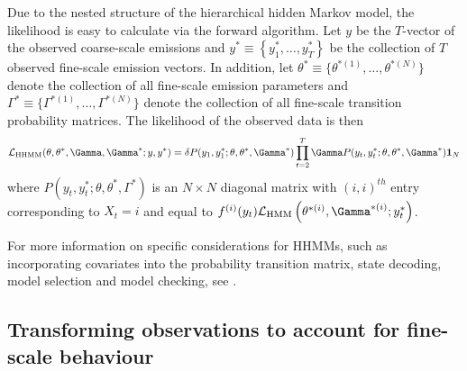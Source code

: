 Due to the nested structure of the hierarchical hidden Markov model, the likelihood is easy to calculate via the forward algorithm.
%
Let $y$ be the $T$-vector of the observed coarse-scale emissions and
$y^* \equiv \left\{y^*_1, \ldots,y^*_T\right\}$ be the collection of $T$ observed fine-scale emission vectors.
%
In addition, let $\theta^* \equiv \{\theta^{*(1)}, \ldots, \theta^{*(N)}\}$ denote the collection of all fine-scale emission parameters and $\Gamma^* \equiv \{\Gamma^{*(1)}, \ldots, \Gamma^{*(N)}\}$ denote the collection of all fine-scale transition probability matrices. The likelihood of the observed data is then
%
\[
\calL_{\text{HHMM}}(\theta,\theta^*,\Gamma,\Gamma^*;y,y^*) = \delta P(y_1,y_1^*;\theta,\theta^*,\Gamma^*) \prod_{t=2}^T \Gamma P(y_t,y_t^*;\theta,\theta^*,\Gamma^*) \mathbf{1}_N
\]
%
where $P(y_t,y_t^*;\theta,\theta^*,\Gamma^*)$ is an $N \times N$ diagonal matrix with $(i,i)^{th}$ entry corresponding to $X_t=i$ and equal to 
$f^{(i)}(y_t)\calL_{\text{HMM}}\left(\theta^{*(i)},
\Gamma^{*(i)};y_t^*\right)$. 

For more information on specific considerations for HHMMs, such as incorporating covariates into the probability transition matrix, state decoding, model selection and model checking, see \citet{Adam:2019}. 

\subsection{Transforming observations to account for fine-scale behaviour}
\label{subsec:STFT}

